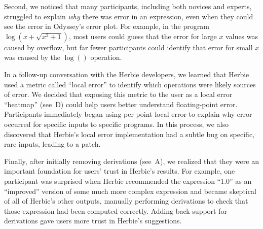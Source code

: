 Second, we noticed that many participants,
  including both novices and experts, 
  struggled to explain \textit{why} there was error in an expression,
  even when they could see the error in Odyssey's error plot.
For example, in the program $\log(x + \sqrt{x^2 + 1})$,
  most users could guess
  that the error for large $x$ values was caused by overflow, but
  far fewer participants could identify that error for small $x$
  was caused by the $\log()$ operation.

  In a follow-up conversation with the Herbie developers,
  we learned that Herbie used a metric called ``local error''
  to identify which operations were likely sources of error.
We decided that exposing this metric to the user
  as a local error ``heatmap'' (see~D)
  could help users better understand floating-point error.
Participants immediately began using per-point local error 
  to explain why error occurred for specific inputs to specific programs.
In this process, we also discovered
  that Herbie's local error implementation
  had a subtle bug on specific, rare inputs, leading to a patch.


Finally, after initially removing derivations (see~A),
  we realized that they were an important foundation for users' trust
  in Herbie's results.
For example, one participant was surprised
  when Herbie recommended the expression ``1.0''
  as an ``improved'' version of some much more complex expression
  and became skeptical of all of Herbie's other outputs,
  manually performing derivations to check
  that those expression had been computed correctly.
Adding back support for derivations
  gave users more trust in Herbie's suggestions.

